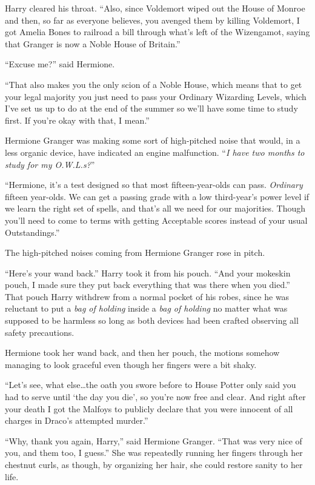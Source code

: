 Harry cleared his throat. “Also, since Voldemort wiped out the House of Monroe and then, so far as everyone believes, you avenged them by killing Voldemort, I got Amelia Bones to railroad a bill through what’s left of the Wizengamot, saying that Granger is now a Noble House of Britain.”

“Excuse me?” said Hermione.

“That also makes you the only scion of a Noble House, which means that to get your legal majority you just need to pass your Ordinary Wizarding Levels, which I’ve set us up to do at the end of the summer so we’ll have some time to study first. If you’re okay with that, I mean.”

Hermione Granger was making some sort of high-pitched noise that would, in a less organic device, have indicated an engine malfunction. “\emph{I have two months to study for my O.W.L.s?}”

“Hermione, it’s a test designed so that most fifteen-year-olds can pass. \emph{Ordinary} fifteen year-olds. We can get a passing grade with a low third-year’s power level if we learn the right set of spells, and that’s all we need for our majorities. Though you’ll need to come to terms with getting Acceptable scores instead of your usual Outstandings.”

The high-pitched noises coming from Hermione Granger rose in pitch.

“Here’s your wand back.” Harry took it from his pouch. “And your mokeskin pouch, I made sure they put back everything that was there when you died.” That pouch Harry withdrew from a normal pocket of his robes, since he was reluctant to put a \emph{bag of holding} inside a \emph{bag of holding} no matter what was supposed to be harmless so long as both devices had been crafted observing all safety precautions.

Hermione took her wand back, and then her pouch, the motions somehow managing to look graceful even though her fingers were a bit shaky.

“Let’s see, what else…the oath you swore before to House Potter only said you had to serve until ‘the day you die’, so you’re now free and clear. And right after your death I got the Malfoys to publicly declare that you were innocent of all charges in Draco’s attempted murder.”

“Why, thank you again, Harry,” said Hermione Granger. “That was very nice of you, and them too, I guess.” She was repeatedly running her fingers through her chestnut curls, as though, by organizing her hair, she could restore sanity to her life.


